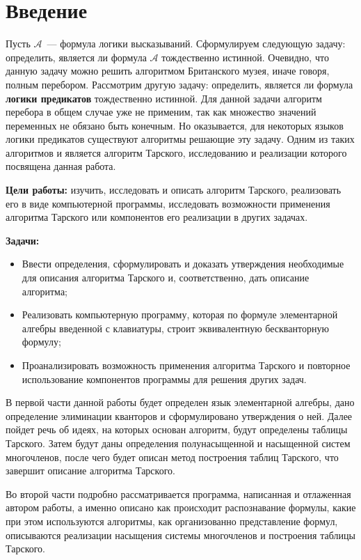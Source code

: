 \section*{Введение}

Пусть $\mathcal{A}$~--- формула логики высказываний. 
Сформулируем следующую задачу: определить, является ли формула $\mathcal{A}$ тождественно истинной. 
Очевидно, что данную задачу можно решить алгоритмом Британского музея, иначе говоря, полным перебором.
Рассмотрим другую задачу: определить, является ли формула \textbf{логики предикатов} тождественно истинной. 
Для данной задачи алгоритм перебора в общем случае уже не применим, так как множество значений переменных не обязано быть конечным. Но оказывается, для некоторых языков логики предикатов существуют алгоритмы решающие эту задачу. Одним из таких алгоритмов и является алгоритм Тарского, исследованию и реализации которого посвящена данная работа.

\textbf{Цели работы:} изучить, исследовать и описать алгоритм Тарского, реализовать его в виде компьютерной программы, исследовать возможности применения алгоритма Тарского или компонентов его реализации в других задачах.

\textbf{Задачи:}
\begin{itemize}
	\item Ввести определения, сформулировать и доказать утверждения необходимые для описания алгоритма Тарского и, соответственно, дать описание алгоритма;
	\item Реализовать компьютерную программу, которая по формуле элементарной алгебры введенной с клавиатуры, строит эквивалентную бескванторную формулу;
	\item Проанализировать возможность применения алгоритма Тарского и повторное использование компонентов программы для решения других задач. 
\end{itemize}

В первой части данной работы будет определен язык элементарной алгебры, дано определение элиминации кванторов и сформулировано утверждения о ней. Далее пойдет речь об идеях, на которых основан алгоритм, будут определены таблицы Тарского. Затем будут даны определения полунасыщенной и насыщенной систем многочленов, после чего будет описан метод построения таблиц Тарского, что завершит описание алгоритма Тарского.

Во второй части подробно рассматривается программа, написанная и отлаженная автором работы, а именно описано как происходит распознавание формулы, какие при этом используются алгоритмы, как организованно представление формул, описываются реализации насыщения системы многочленов и построения таблицы Тарского. 